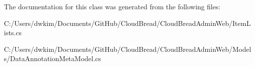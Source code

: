 The documentation for this class was generated from the following files\+:\begin{DoxyCompactItemize}
\item 
C\+:/\+Users/dwkim/\+Documents/\+Git\+Hub/\+Cloud\+Bread/\+Cloud\+Bread\+Admin\+Web/Item\+Lists.\+cs\item 
C\+:/\+Users/dwkim/\+Documents/\+Git\+Hub/\+Cloud\+Bread/\+Cloud\+Bread\+Admin\+Web/\+Models/Data\+Annotation\+Meta\+Model.\+cs\end{DoxyCompactItemize}
